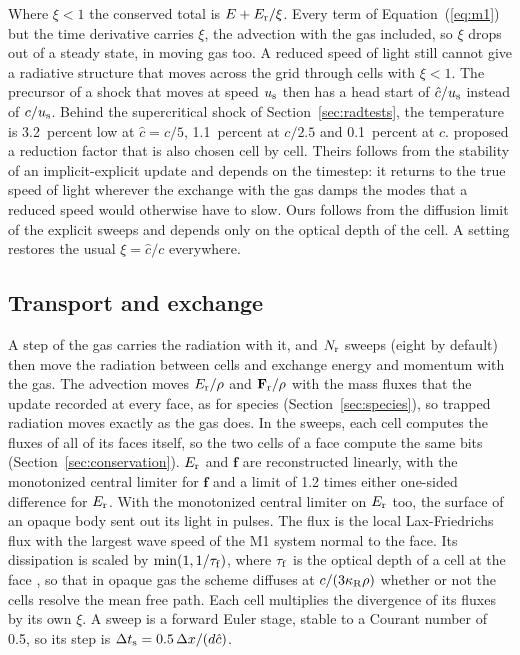 \documentclass[twocolumn]{aastex701}
\begin{document}
Where $\xi < 1$ the conserved total is $E + E_{\rm r}/\xi$. Every term of Equation~(\ref{eq:m1}) but the time derivative carries $\xi$, the advection with the gas included, so $\xi$ drops out of a steady state, in moving gas too. A reduced speed of light still cannot give a radiative structure that moves across the grid through cells with $\xi < 1$. The precursor of a shock that moves at speed $u_{\rm s}$ then has a head start of $\hat{c}/u_{\rm s}$ instead of $c/u_{\rm s}$. Behind the supercritical shock of Section~\ref{sec:radtests}, the temperature is 3.2~percent low at $\hat{c} = c/5$, 1.1~percent at $c/2.5$ and 0.1~percent at $c$. \citet{He2026} proposed a reduction factor that is also chosen cell by cell. Theirs follows from the stability of an implicit-explicit update and depends on the timestep: it returns to the true speed of light wherever the exchange with the gas damps the modes that a reduced speed would otherwise have to slow. Ours follows from the diffusion limit of the explicit sweeps and depends only on the optical depth of the cell. A setting restores the usual $\xi = \hat{c}/c$ everywhere.

\subsection{Transport and exchange}
\label{sec:radstep}

A step of the gas carries the radiation with it, and $N_{\rm r}$ sweeps (eight by default) then move the radiation between cells and exchange energy and momentum with the gas. The advection moves $E_{\rm r}/\rho$ and $\mathbf{F}_{\rm r}/\rho$ with the mass fluxes that the update recorded at every face, as for species (Section~\ref{sec:species}), so trapped radiation moves exactly as the gas does. In the sweeps, each cell computes the fluxes of all of its faces itself, so the two cells of a face compute the same bits (Section~\ref{sec:conservation}). $E_{\rm r}$ and $\mathbf{f}$ are reconstructed linearly, with the monotonized central limiter for $\mathbf{f}$ and a limit of 1.2 times either one-sided difference for $E_{\rm r}$. With the monotonized central limiter on $E_{\rm r}$ too, the surface of an opaque body sent out its light in pulses. The flux is the local Lax-Friedrichs flux with the largest wave speed of the M1 system normal to the face. Its dissipation is scaled by $\min(1, 1/\tau_{\rm f})$, where $\tau_{\rm f}$ is the optical depth of a cell at the face \citep{Skinner2019}, so that in opaque gas the scheme diffuses at $c/(3\kappa_{\rm R}\rho)$ whether or not the cells resolve the mean free path. Each cell multiplies the divergence of its fluxes by its own $\xi$. A sweep is a forward Euler stage, stable to a Courant number of 0.5, so its step is $\Delta t_{\rm s} = 0.5\,\Delta x/(d\hat{c})$.
\end{document}
